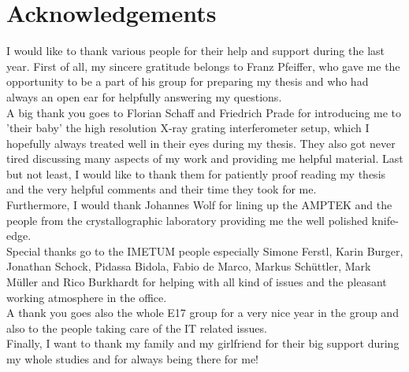 \section*{Acknowledgements}

I would like to thank various people for their help and support during the last year.
First of all, my sincere gratitude belongs to Franz Pfeiffer, who gave me the opportunity to be a part of his group for preparing my thesis and who had always an open ear for helpfully answering my questions.\\

A big thank you goes to Florian Schaff and Friedrich Prade for introducing me to 'their baby' the high resolution X-ray grating interferometer setup, which I hopefully always treated well in their eyes during my thesis. They also got never tired discussing many aspects of my work and providing me helpful material. Last but not least, I would like to thank them for patiently proof reading my thesis and the very helpful comments and their time they took for me.\\

Furthermore, I would thank Johannes Wolf for lining up the AMPTEK and the people from the crystallographic laboratory providing me the well polished knife-edge.\\

Special thanks go to the IMETUM people especially Simone Ferstl, Karin Burger, Jonathan Schock, Pidassa Bidola, Fabio de Marco, Markus Schüttler, Mark Müller and Rico Burkhardt for helping with all kind of issues and the pleasant working atmosphere in the office.\\

A thank you goes also the whole E17 group for a very nice year in the group and also to the people taking care of the IT related issues.\\

Finally, I want to thank my family and my girlfriend for their big support during my whole studies and for always being there for me!   

